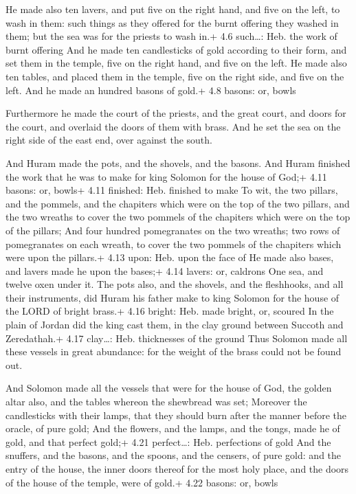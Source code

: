  He made also ten lavers, and put five on the right hand,
and five on the left, to wash in them: such things as they offered for
the burnt offering they washed in them; but the sea was for the priests
to wash in.+ 4.6 such\ldots: Heb. the work of burnt offering
 And he made ten candlesticks of gold according to their
form, and set them in the temple, five on the right hand, and five on
the left.  He made also ten tables, and placed them in the
temple, five on the right side, and five on the left. And he made an
hundred basons of gold.+ 4.8 basons: or, bowls

 Furthermore he made the court of the priests, and the
great court, and doors for the court, and overlaid the doors of them
with brass.  And he set the sea on the right side of the
east end, over against the south.

 And Huram made the pots, and the shovels, and the basons.
And Huram finished the work that he was to make for king Solomon for the
house of God;+ 4.11 basons: or, bowls+ 4.11 finished: Heb. finished to
make  To wit, the two pillars, and the pommels, and the
chapiters which were on the top of the two pillars, and the two wreaths
to cover the two pommels of the chapiters which were on the top of the
pillars;  And four hundred pomegranates on the two wreaths;
two rows of pomegranates on each wreath, to cover the two pommels of the
chapiters which were upon the pillars.+ 4.13 upon: Heb. upon the face of
 He made also bases, and lavers made he upon the bases;+
4.14 lavers: or, caldrons  One sea, and twelve oxen under
it.  The pots also, and the shovels, and the fleshhooks,
and all their instruments, did Huram his father make to king Solomon for
the house of the LORD of bright brass.+ 4.16 bright: Heb. made bright,
or, scoured  In the plain of Jordan did the king cast them,
in the clay ground between Succoth and Zeredathah.+ 4.17 clay\ldots:
Heb. thicknesses of the ground  Thus Solomon made all these
vessels in great abundance: for the weight of the brass could not be
found out.

 And Solomon made all the vessels that were for the house
of God, the golden altar also, and the tables whereon the shewbread was
set;  Moreover the candlesticks with their lamps, that they
should burn after the manner before the oracle, of pure gold;
 And the flowers, and the lamps, and the tongs, made he of
gold, and that perfect gold;+ 4.21 perfect\ldots: Heb. perfections of
gold  And the snuffers, and the basons, and the spoons, and
the censers, of pure gold: and the entry of the house, the inner doors
thereof for the most holy place, and the doors of the house of the
temple, were of gold.+ 4.22 basons: or, bowls

